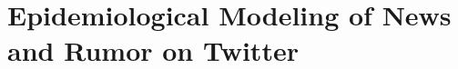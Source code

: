 
\chapter{Epidemiological Modeling of News and Rumor on Twitter}

\begingroup
\newcommand{\score}{S}
\newcommand{\myalgo}{CoolAlgo}

%









\endgroup
